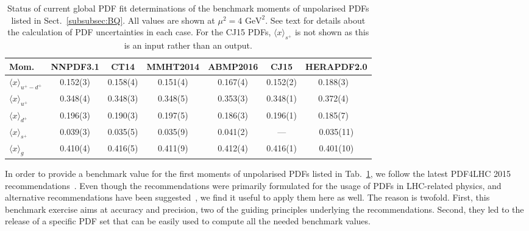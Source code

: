 \begin{table}[!t]
\centering
\renewcommand{\arraystretch}{1.2}
\begin{tabular}{lcccccc}
\toprule
Mom. 
& NNPDF3.1 & CT14 & MMHT2014 & ABMP2016 & CJ15 & HERAPDF2.0 \\
\midrule
$\langle x \rangle_{u^+-d^+}$ 
& 0.152(3) & 0.158(4) & 0.151(4) & 0.167(4) & 0.152(2) & 0.188(3)\ \,\\
$\langle x \rangle_{u^+}$    
& 0.348(4) & 0.348(3) & 0.348(5) & 0.353(3) & 0.348(1) & 0.372(4)\ \,\\
$\langle x \rangle_{d^+}$    
& 0.196(3) & 0.190(3) & 0.197(5) & 0.186(3) & 0.196(1) & 0.185(7)\ \,\\
$\langle x \rangle_{s^+}$    
%
%
& 0.039(3) & 0.035(5) & 0.035(9) & 0.041(2) & ---   & 0.035(11)\\
$\langle x \rangle_{g}$     
& 0.410(4) & 0.416(5) & 0.411(9) & 0.412(4) & 0.416(1) & 0.401(10)\\
\bottomrule
\end{tabular}
\caption{\small Status of current global PDF fit determinations of the 
benchmark moments of unpolarised PDFs listed in Sect.~\ref{subsubsec:BQ}.
All values are shown at $\mu^2=4\mbox{ GeV}^2$.
%
See text for details about the calculation of PDF uncertainties in each case.
%
For the CJ15 PDFs, $\langle x \rangle_{s^+}$  is not shown as this is an input rather than an output.
%
}
\label{tab:unpPDFmoms}
\end{table}

In order to provide a benchmark value for the first moments of unpolarised PDFs
listed in Tab.~\ref{tab:unpPDFmoms}, we follow the latest PDF4LHC 2015 
recommendations~\cite{Butterworth:2015oua}.
%
Even though the recommendations were primarily formulated for the usage of PDFs
in LHC-related physics, and alternative recommendations have been 
suggested~\cite{Accardi:2016ndt}, we find it useful to apply them here as well.
%
The reason is twofold.
%
First, this benchmark exercise aims at accuracy and precision,  
two of the guiding principles underlying the recommendations.
%
Second, they led to the release of a specific PDF set
that can be easily used to compute all the needed benchmark values.


